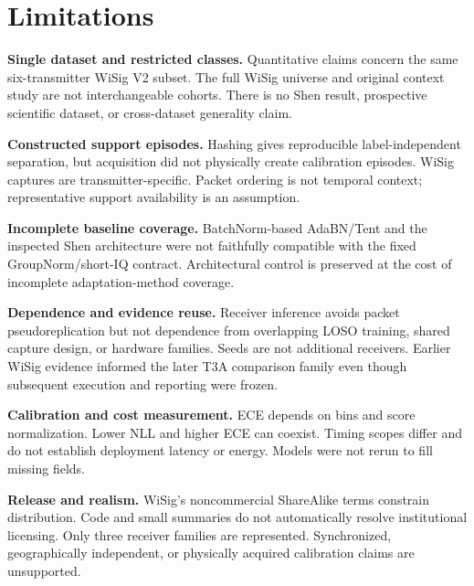 \section{Limitations}
\textbf{Single dataset and restricted classes.} Quantitative claims concern the same six-transmitter WiSig V2 subset. The full WiSig universe and original context study are not interchangeable cohorts. There is no Shen result, prospective scientific dataset, or cross-dataset generality claim.

\textbf{Constructed support episodes.} Hashing gives reproducible label-independent separation, but acquisition did not physically create calibration episodes. WiSig captures are transmitter-specific. Packet ordering is not temporal context; representative support availability is an assumption.

\textbf{Incomplete baseline coverage.} BatchNorm-based AdaBN/Tent and the inspected Shen architecture were not faithfully compatible with the fixed GroupNorm/short-IQ contract. Architectural control is preserved at the cost of incomplete adaptation-method coverage.

\textbf{Dependence and evidence reuse.} Receiver inference avoids packet pseudoreplication but not dependence from overlapping LOSO training, shared capture design, or hardware families. Seeds are not additional receivers. Earlier WiSig evidence informed the later T3A comparison family even though subsequent execution and reporting were frozen.

\textbf{Calibration and cost measurement.} ECE depends on bins and score normalization. Lower NLL and higher ECE can coexist. Timing scopes differ and do not establish deployment latency or energy. Models were not rerun to fill missing fields.

\textbf{Release and realism.} WiSig's noncommercial ShareAlike terms constrain distribution. Code and small summaries do not automatically resolve institutional licensing. Only three receiver families are represented. Synchronized, geographically independent, or physically acquired calibration claims are unsupported.
